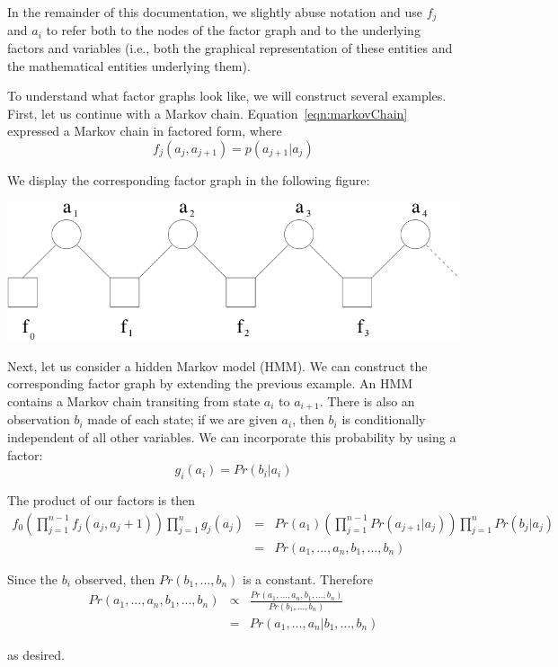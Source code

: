 In the remainder of this documentation, we slightly abuse notation and use $f_j$  and $a_i$  
to refer both to the nodes of the factor graph and to the underlying factors and variables 
(i.e., both the graphical representation of these entities and the mathematical entities underlying them).

To understand what factor graphs look like, we will construct several examples.  
First, let us continue with a Markov chain. Equation~\ref{eqn:markovChain} expressed a Markov chain in factored form, where  
%
\[
f_j(a_j,a_{j+1})=p(a_{j+1}|a_j)
\]

We display the corresponding factor graph in the following figure:

\includegraphics{images/FactorGraphExample.png}

Next, let us consider a hidden Markov model (HMM).  We can construct the 
corresponding factor graph by extending the previous example.  An HMM 
contains a Markov chain transiting from state $a_{i}$ to $a_{i+1}$. There is also an 
observation $b_{i}$ made of each state; if we are given $a_{i}$, then $b_{i}$
is conditionally independent of all other variables. We can incorporate 
this probability by using a factor:
%
\[
g_i(a_i) = Pr(b_i|a_i)
\]

The product of our factors is then
%
\begin{eqnarray*}
f_0 \left( \prod_{j=1}^{n-1} f_j(a_j,a_j+1) \right) \prod_{j=1}^n g_j(a_j)  &=& 
    Pr(a_1) \left( \prod_{j=1}^{n-1} Pr(a_{j+1}|a_j)  \right) \prod_{j=1}^n Pr(b_j|a_j)  \\
  &=& Pr(a_1,...,a_n,b_1,...,b_n)
\end{eqnarray*}

Since the $b_i$ observed, then $Pr(b_1,...,b_n)$ is a constant.  Therefore
%
\begin{eqnarray*}
Pr(a_1,...,a_n,b_1,...,b_n) & \propto & \frac{Pr(a_1,...,a_n,b_1,...,b_n)}{Pr(b_1,...,b_n)} \\
			    &=& Pr(a_1,...,a_n|b_1,...,b_n)
\end{eqnarray*}

as desired.

